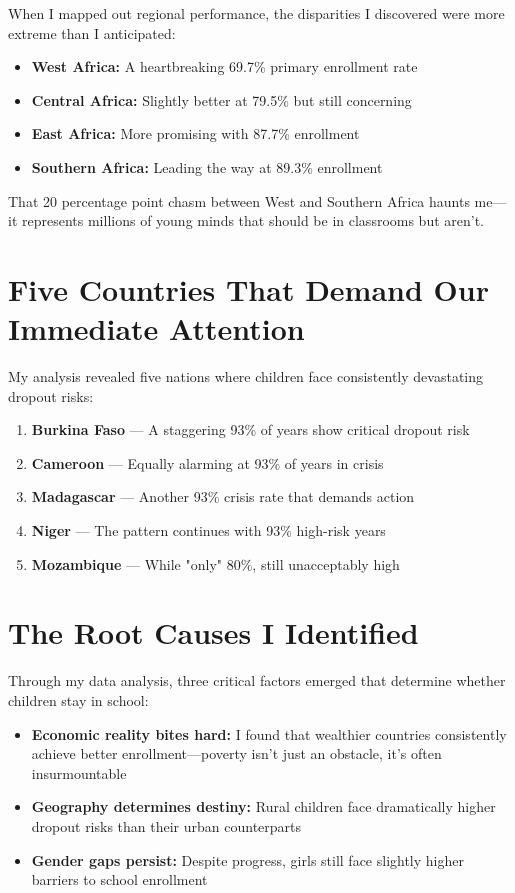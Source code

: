 \documentclass[12pt,a4paper]{article}
\begin{document}
When I mapped out regional performance, the disparities I discovered were more extreme than I anticipated:

\begin{itemize}
    \item \textbf{West Africa:} A heartbreaking 69.7\% primary enrollment rate
    \item \textbf{Central Africa:} Slightly better at 79.5\% but still concerning
    \item \textbf{East Africa:} More promising with 87.7\% enrollment
    \item \textbf{Southern Africa:} Leading the way at 89.3\% enrollment
\end{itemize}

That 20 percentage point chasm between West and Southern Africa haunts me---it represents millions of young minds that should be in classrooms but aren't.

\section{Five Countries That Demand Our Immediate Attention}

My analysis revealed five nations where children face consistently devastating dropout risks:

\begin{enumerate}
    \item \textbf{Burkina Faso} --- A staggering 93\% of years show critical dropout risk
    \item \textbf{Cameroon} --- Equally alarming at 93\% of years in crisis
    \item \textbf{Madagascar} --- Another 93\% crisis rate that demands action
    \item \textbf{Niger} --- The pattern continues with 93\% high-risk years
    \item \textbf{Mozambique} --- While "only" 80\%, still unacceptably high
\end{enumerate}

\section{The Root Causes I Identified}

Through my data analysis, three critical factors emerged that determine whether children stay in school:

\begin{itemize}
    \item \textbf{Economic reality bites hard:} I found that wealthier countries consistently achieve better enrollment---poverty isn't just an obstacle, it's often insurmountable
    \item \textbf{Geography determines destiny:} Rural children face dramatically higher dropout risks than their urban counterparts
    \item \textbf{Gender gaps persist:} Despite progress, girls still face slightly higher barriers to school enrollment
\end{itemize}
\end{document}
